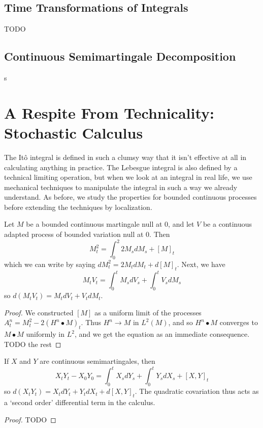 \section{Time Transformations of Integrals}

TODO

\section{Continuous Semimartingale Decomposition}

s

\chapter{A Respite From Technicality: Stochastic Calculus}

The It\^{o} integral is defined in such a clumsy way that it isn't effective at all in calculating anything in practice. The Lebesgue integral is also defined by a technical limiting operation, but when we look at an integral in real life, we use mechanical techniques to manipulate the integral in such a way we already understand. As before, we study the properties for bounded continuous processes before extending the techniques by localization.

\begin{lemma}
    Let $M$ be a bounded continuous martingale null at 0, and let $V$ be a continuous adapted process of bounded variation null at 0. Then
    \[ M_t^2 = \int_0^2 2M_s dM_s + [M]_t \]
    which we can write by saying $dM_t^2 = 2M_t dM_t + d[M]_t$. Next, we have
    \[ M_t V_t = \int_0^t M_s dV_s + \int_0^t V_s dM_s \]
    so $d(M_t V_t) = M_t dV_t + V_t dM_t$.
\end{lemma}
\begin{proof}
    We constructed $[M]$ as a uniform limit of the processes $A^n_t = M_t^2 - 2 (H^n \bullet M)_t$. Thus $H^n \to M$ in $L^2(M)$, and so $H^n \bullet M$ converges to $M \bullet M$ uniformly in $L^2$, and we get the equation as an immediate consequence. TODO the rest
\end{proof}

\begin{theorem}
    If $X$ and $Y$ are continuous semimartingales, then
    \[ X_tY_t - X_0Y_0 = \int_0^t X_s dY_s + \int_0^t Y_s dX_s + [X,Y]_t \]
    so $d(X_tY_t) = X_t dY_t + Y_t dX_t + d[X,Y]_t$. The quadratic covariation thus acts as a `second order' differential term in the calculus.
\end{theorem}
\begin{proof}
    TODO
\end{proof}

